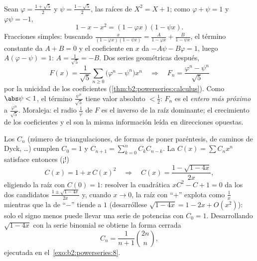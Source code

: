 \begin{example}\label{ex:b2:powerseries:binet}
Sean $\varphi = \frac{1+\sqrt5}{2}$ y $\psi = \frac{1-\sqrt5}{2}$,
las raíces de $X^2 = X + 1$; como $\varphi + \psi = 1$ y
$\varphi\psi = -1$,
\[
1 - x - x^2 = (1 - \varphi x)(1 - \psi x) .
\]
Fracciones simples: buscando $\frac{x}{(1-\varphi x)(1-\psi x)} =
\frac{A}{1 - \varphi x} + \frac{B}{1 - \psi x}$, el término
constante da $A + B = 0$ y el coeficiente en $x$ da $-A\psi -
B\varphi = 1$, luego $A(\varphi - \psi) = 1$: $A =
\frac{1}{\sqrt5} = -B$. Dos series geométricas después,
\[
F(x) = \frac{1}{\sqrt5}\sum_{n\geq0}
\bigl(\varphi^n - \psi^n\bigr)x^n
\quad\Longrightarrow\quad
F_n = \frac{\varphi^n - \psi^n}{\sqrt5}
\]
por la unicidad de los coeficientes
(\cref{thm:b2:powerseries:calculus}). Como $\abs\psi < 1$, el
término $\frac{\psi^n}{\sqrt5}$ tiene valor absoluto $< \frac12$:
$F_n$ es el \emph{entero más próximo} a $\frac{\varphi^n}{\sqrt5}$.
Moraleja: el radio $\frac1\varphi$ de $F$ es el inverso de la raíz
dominante; el crecimiento de los coeficientes y el
 son la misma información leída en
direcciones opuestas.
\end{example}

\begin{example}\label{ex:b2:powerseries:catalan}
Los  $C_n$ (número de triangulaciones, de
formas de poner paréntesis, de caminos de Dyck, \dots) cumplen $C_0
= 1$ y $C_{n+1} = \sum_{k=0}^n C_kC_{n-k}$. La
 $C(x) = \sum C_nx^n$ satisface entonces
(¡!)
\[
C(x) = 1 + x\,C(x)^2
\quad\Longrightarrow\quad
C(x) = \frac{1 - \sqrt{1 - 4x}}{2x} ,
\]
eligiendo la raíz con $C(0) = 1$: resolver la cuadrática $xC^2 - C +
1 = 0$ da los dos candidatos $\frac{1 \pm \sqrt{1-4x}}{2x}$ y,
cuando $x \to 0$, la raíz con ``$+$'' explota como $\frac1x$
mientras que la de ``$-$'' tiende a $1$ (desarróllese $\sqrt{1-4x} =
1 - 2x + O(x^2)$): solo el signo menos puede llevar una serie de
potencias con $C_0 = 1$. Desarrollando $\sqrt{1 - 4x}$ con la serie
binomial se obtiene la forma cerrada
\[
C_n = \frac{1}{n+1}\binom{2n}{n} ,
\]
ejecutada en el~\cref{exo:b2:powerseries:8}.
\end{example}

